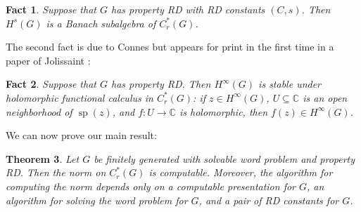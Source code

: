 \documentclass{amsart}
\DeclareMathOperator{\spec}{sp}
\newcommand{\Cr}{C^*_r(G)}
\theoremstyle{plain}
\newtheorem{theorem}{Theorem}[section]
\newtheorem{fact}[theorem]{Fact}
\theoremstyle{definition}
\numberwithin{equation}{section}
\begin{document}
\begin{fact}\label{fact1}
Suppose that $G$ has property RD with RD constants $(C,s)$.  Then $H^s(G)$ is a Banach subalgebra of $C^*_r(G)$.  
\end{fact}

The second fact is due to Connes but appears for print in the first time in a paper of Jolissaint \cite[Theorem A]{jolissaint2}:

\begin{fact}\label{fact2}
Suppose that $G$ has property RD.  Then $H^\infty(G)$ is stable under holomorphic functional calculus in $\Cr$:  if $z\in H^\infty(G)$, $U\subseteq \mathbb{C}$ is an open neighborhood of $\spec(z)$, and $f:U\to \mathbb{C}$ is holomorphic, then $f(z)\in H^\infty(G)$.
\end{fact}

We can now prove our main result:

\begin{theorem}\label{thm:main}
Let $G$ be finitely generated with solvable word problem and property RD.  Then the norm on $\Cr$ is computable.  Moreover, the algorithm for computing the norm depends only on a computable presentation for $G$, an algorithm for solving the word problem for $G$, and a pair of RD constants for $G$.
\end{theorem}
\end{document}
